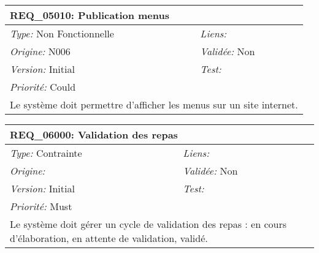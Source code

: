 \begin{table}[!h]

\begin{tabular}{|p{60mm}p{100mm}|}

\hline

\multicolumn{2}{|l|}{\textbf{REQ\_05010:} Publication menus} \\ \hline

\emph{Type:} Non Fonctionnelle & \emph{Liens:}  \\

\emph{Origine:} N006 & \emph{Validée:} Non \\

\emph{Version:} Initial & \emph{Test:}  \\

\emph{Priorité:} Could & \\ \hline

\multicolumn{2}{|p{16cm}|}{Le système doit permettre d'afficher les menus sur un site internet.} \\ \hline

\end{tabular}

\end{table}



\begin{table}[!h]

\begin{tabular}{|p{60mm}p{100mm}|}

\hline

\multicolumn{2}{|l|}{\textbf{REQ\_06000:} Validation des repas} \\ \hline

\emph{Type:} Contrainte & \emph{Liens:}  \\

\emph{Origine:}  & \emph{Validée:} Non \\

\emph{Version:} Initial & \emph{Test:}  \\

\emph{Priorité:} Must & \\ \hline

\multicolumn{2}{|p{16cm}|}{Le système doit gérer un cycle de validation des repas : en cours d'élaboration, en attente de validation, validé.} \\ \hline

\end{tabular}

\end{table}



